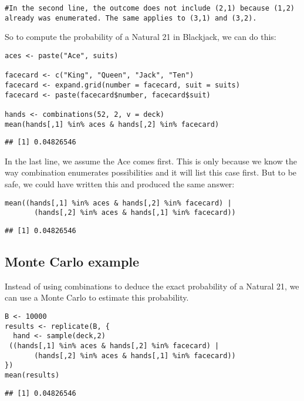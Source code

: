 \documentclass[
]{article}
\begin{document}
\begin{verbatim}
#In the second line, the outcome does not include (2,1) because (1,2) already was enumerated. The same applies to (3,1) and (3,2).
\end{verbatim}

So to compute the probability of a Natural 21 in Blackjack, we can do
this:

\begin{verbatim}
aces <- paste("Ace", suits)

facecard <- c("King", "Queen", "Jack", "Ten")
facecard <- expand.grid(number = facecard, suit = suits)
facecard <- paste(facecard$number, facecard$suit)

hands <- combinations(52, 2, v = deck)
mean(hands[,1] %in% aces & hands[,2] %in% facecard)
\end{verbatim}

\begin{verbatim}
## [1] 0.04826546
\end{verbatim}

In the last line, we assume the Ace comes first. This is only because we
know the way combination enumerates possibilities and it will list this
case first. But to be safe, we could have written this and produced the
same answer:

\begin{verbatim}
mean((hands[,1] %in% aces & hands[,2] %in% facecard) |
       (hands[,2] %in% aces & hands[,1] %in% facecard))
\end{verbatim}

\begin{verbatim}
## [1] 0.04826546
\end{verbatim}

\hypertarget{monte-carlo-example}{%
\subsection{Monte Carlo example}\label{monte-carlo-example}}

Instead of using combinations to deduce the exact probability of a
Natural 21, we can use a Monte Carlo to estimate this probability.

\begin{verbatim}
B <- 10000
results <- replicate(B, {
  hand <- sample(deck,2)
 ((hands[,1] %in% aces & hands[,2] %in% facecard) |
       (hands[,2] %in% aces & hands[,1] %in% facecard))
})
mean(results)
\end{verbatim}

\begin{verbatim}
## [1] 0.04826546
\end{verbatim}
\end{document}
